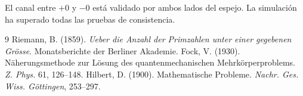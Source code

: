 \documentclass[12pt,a4paper]{article}
\begin{document}
El canal entre \(+0\) y \(-0\) está validado por ambos lados del espejo. La simulación ha superado todas las pruebas de consistencia.

\begin{thebibliography}{9}
 Riemann, B. (1859). \emph{Ueber die Anzahl der Primzahlen unter einer gegebenen Grösse}. Monatsberichte der Berliner Akademie.
 Fock, V. (1930). Näherungsmethode zur Lösung des quantenmechanischen Mehrkörperproblems. \emph{Z. Phys.} 61, 126--148.
 Hilbert, D. (1900). Mathematische Probleme. \emph{Nachr. Ges. Wiss. Göttingen}, 253--297.
\end{thebibliography}
\end{document}
